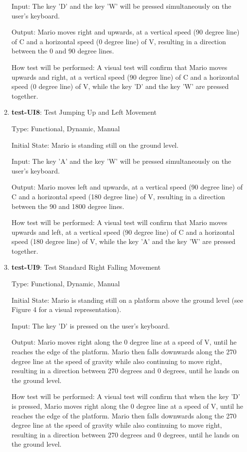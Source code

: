 \documentclass[12pt, titlepage]{article}
\begin{document}
\begin{enumerate}
Input: The key 'D' and the key 'W' will be pressed simultaneously on the user's keyboard.

Output: Mario moves right and upwards, at a vertical speed (90 degree line) of C and a horizontal speed (0 degree line) of V, resulting in a direction between the 0 and 90 degree lines.

How test will be performed: A visual test will confirm that Mario moves upwards and right, at a vertical speed (90 degree line) of C and a horizontal speed (0 degree line) of V, while the key 'D' and the key 'W' are pressed together.

\item{\textbf{test-UI8}: Test Jumping Up and Left Movement\\}

Type: Functional, Dynamic, Manual

Initial State: Mario is standing still on the ground level.

Input: The key 'A' and the key 'W' will be pressed simultaneously on the user's keyboard.

Output: Mario moves left and upwards, at a vertical speed (90 degree line) of C and a horizontal speed (180 degree line) of V, resulting in a direction between the 90 and 1800 degree lines.

How test will be performed: A visual test will confirm that Mario moves upwards and left, at a vertical speed (90 degree line) of C and a horizontal speed (180 degree line) of V, while the key 'A' and the key 'W' are pressed together.

\item{\textbf{test-UI9}: Test Standard Right Falling Movement\\}

Type: Functional, Dynamic, Manual

Initial State: Mario is standing still on a platform above the ground level (see Figure 4 for a visual representation).

Input: The key 'D' is pressed on the user's keyboard.

Output: Mario moves right along the 0 degree line at a speed of V, until he reaches the edge of the platform. Mario then falls downwards along the 270 degree line at the speed of gravity while also continuing to move right, resulting in a direction between 270 degrees and 0 degrees, until he lands on the ground level.

How test will be performed: A visual test will confirm that when the key 'D' is pressed, Mario moves right along the 0 degree line at a speed of V, until he reaches the edge of the platform. Mario then falls downwards along the 270 degree line at the speed of gravity while also continuing to move right, resulting in a direction between 270 degrees and 0 degrees, until he lands on the ground level.


\end{enumerate}
\end{document}
